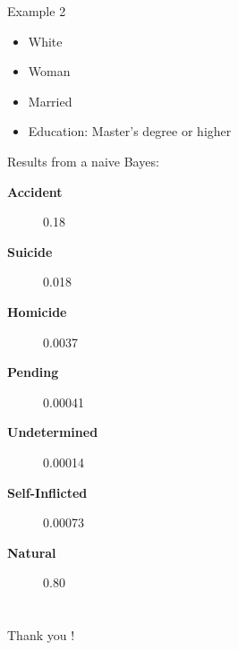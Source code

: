 \documentclass[xcolor=table]{beamer}
\begin{document}
\begin{frame}{Example 2}
  \begin{itemize}
    \item White
    \item Woman
    \item Married
    \item Education: Master's degree or higher
  \end{itemize}
  
  Results from a naive Bayes:
  \begin{description}
    \item [\textbf{Accident}] 0.18
    \item [\textbf{Suicide}] 0.018
    \item [\textbf{Homicide}] 0.0037
    \item [\textbf{Pending}] 0.00041
    \item [\textbf{Undetermined}] 0.00014
    \item [\textbf{Self-Inflicted}] 0.00073
    \item [\textbf{Natural}] 0.80
  \end{description}
\end{frame}

\section*{}
\begin{frame}
  \begin{center}
  \LARGE 
  Thank you !
  \end{center}
\end{frame}
	
\end{document}
